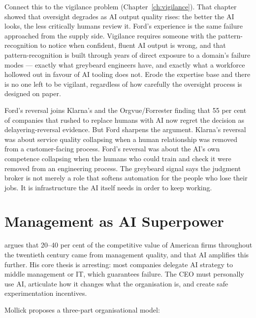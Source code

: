 Connect this to the vigilance problem (Chapter~\ref{ch:vigilance}). That chapter showed that oversight degrades as AI output quality rises: the better the AI looks, the less critically humans review it. Ford's experience is the same failure approached from the supply side. Vigilance requires someone with the pattern-recognition to notice when confident, fluent AI output is wrong, and that pattern-recognition is built through years of direct exposure to a domain's failure modes --- exactly what greybeard engineers have, and exactly what a workforce hollowed out in favour of AI tooling does not. Erode the expertise base and there is no one left to be vigilant, regardless of how carefully the oversight process is designed on paper.

Ford's reversal joins Klarna's \parencite{Klarna2025} and the Orgvue/Forrester finding that 55 per cent of companies that rushed to replace humans with AI now regret the decision \parencite{OrgvueForrester2025} as delayering-reversal evidence. But Ford sharpens the argument. Klarna's reversal was about service quality collapsing when a human relationship was removed from a customer-facing process. Ford's reversal was about the AI's own competence collapsing when the humans who could train and check it were removed from an engineering process. The greybeard signal says the judgment broker is not merely a role that softens automation for the people who lose their jobs. It is infrastructure the AI itself needs in order to keep working.

\section{Management as AI Superpower}

\textcite{Mollick2025Management} argues that 20--40 per cent of the competitive value of American firms throughout the twentieth century came from management quality, and that AI amplifies this further. His core thesis is arresting: most companies delegate AI strategy to middle management or IT, which guarantees failure. The CEO must personally use AI, articulate how it changes what the organisation is, and create safe experimentation incentives.

Mollick proposes a three-part organisational model:

